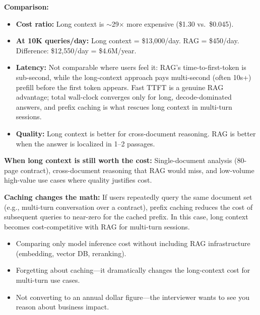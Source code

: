\begin{interviewq}
\textbf{Comparison:}
\begin{itemize}
    \item \textbf{Cost ratio:} Long context is $\sim$29$\times$ more expensive (\$1.30 vs.\ \$0.045).
    \item \textbf{At 10K queries/day:} Long context = \$13,000/day. RAG = \$450/day. Difference: \$12,550/day = \$4.6M/year.
    \item \textbf{Latency:} Not comparable where users feel it: RAG's time-to-first-token is sub-second, while the long-context approach pays multi-second (often 10s+) prefill before the first token appears. Fast TTFT is a genuine RAG advantage; total wall-clock converges only for long, decode-dominated answers, and prefix caching is what rescues long context in multi-turn sessions.
    \item \textbf{Quality:} Long context is better for cross-document reasoning. RAG is better when the answer is localized in 1--2 passages.
\end{itemize}

\textbf{When long context is still worth the cost:} Single-document analysis (80-page contract), cross-document reasoning that RAG would miss, and low-volume high-value use cases where quality justifies cost.

\textbf{Caching changes the math:} If users repeatedly query the same document set (e.g., multi-turn conversation over a contract), prefix caching reduces the cost of subsequent queries to near-zero for the cached prefix. In this case, long context becomes cost-competitive with RAG for multi-turn sessions.

\redflags
\begin{itemize}
    \item Comparing only model inference cost without including RAG infrastructure (embedding, vector DB, reranking).
    \item Forgetting about caching---it dramatically changes the long-context cost for multi-turn use cases.
    \item Not converting to an annual dollar figure---the interviewer wants to see you reason about business impact.
\end{itemize}



\end{interviewq}

